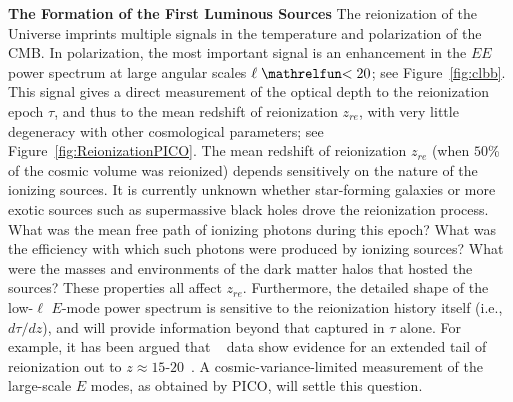\documentclass[PICOReport.tex]{subfiles}
\begin{document}

{\bf The Formation of the First Luminous Sources} \hspace{0.1in} \label{luminoussources}  The reionization of the Universe imprints multiple signals in the temperature and polarization of the CMB.  In polarization, the most important signal is an enhancement in the $EE$ power spectrum at large angular scales $\ell \simlt 20$; see Figure~\ref{fig:clbb}. This signal gives a direct measurement of the optical depth to the reionization epoch $\tau$, and thus to the mean redshift of reionization $z_{re}$, with very little degeneracy with other cosmological parameters; see Figure~\ref{fig:ReionizationPICO}. The mean redshift of reionization $z_{re}$ (when $50$\% of the cosmic volume was reionized) depends sensitively on the nature of the ionizing sources.  It is currently unknown whether star-forming galaxies or more exotic sources such as supermassive black holes drove the reionization process.  What was the mean free path of ionizing photons during this epoch?  What was the efficiency with which such photons were produced by ionizing sources?  What were the masses and environments of the dark matter halos that hosted the sources?  These properties all affect $z_{re}$. Furthermore, the detailed shape of the low-$\ell$ $E$-mode power spectrum is sensitive to the reionization history itself (i.e., $d\tau/dz$), and will provide information beyond that captured in $\tau$ alone.  For example, it has been argued that \planck~ data show evidence for an extended tail of reionization out to $z \approx 15$-$20$~\citep{Miranda2017}.  A cosmic-variance-limited measurement of the large-scale $E$ modes, as obtained by PICO, will settle this question.  
 
\end{document}
